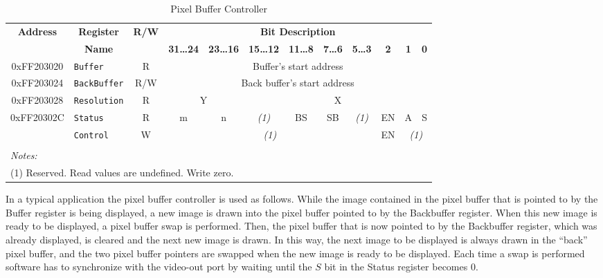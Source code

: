 \begin{table}[h]
    \centering
    \begin{tabular}{|c|l|c|c|c|c|c|c|c|c|c|c|}
        \hline
            \textbf{Address}
            & \multicolumn{1}{c|}{\textbf{Register}}
            & \multirow{2}{*}{\textbf{R/W}}
            & \multicolumn{9}{c|}{\textbf{Bit Description}}
        \\\cline{4-12}
            & \multicolumn{1}{c|}{\textbf{Name}}
            &
            & \textbf{31\ldots24}
            & \textbf{23\ldots16}
            & \textbf{15\ldots12}
            & \textbf{11\ldots8}
            & \textbf{7\ldots6}
            & \textbf{5\ldots3}
            & \textbf{2}
            & \textbf{1}
            & \textbf{0}
        \\\hline
            0xFF203020
            & \texttt{Buffer}
            & R
            & \multicolumn{9}{c|}{Buffer's start address}
        \\\hline
            0xFF203024
            & \texttt{BackBuffer}
            & R/W
            & \multicolumn{9}{c|}{Back buffer's start address}
        \\\hline
            0xFF203028
            & \texttt{Resolution}
            & R
            & \multicolumn{2}{c|}{Y}
            & \multicolumn{7}{c|}{X}
        \\\hline
            \multirow{2}{*}{0xFF20302C}
            & \texttt{Status}
            & R
            & m
            & n
            & {\footnotesize \it (1)}
            & BS
				& SB
            & {\footnotesize \it (1)}
            & EN
            & A
            & S
        \\\cline{2-12}

            & \texttt{Control}
            & W
            & \multicolumn{6}{c|}{\footnotesize \it (1)}
				& EN
            & \multicolumn{2}{c|}{\footnotesize \it (1)}
        \\\hline
                \multicolumn{11}{l}{}
        \\
                \multicolumn{11}{l}{\footnotesize \it{Notes: }}
        \\
                \multicolumn{11}{l}{\footnotesize{(1) Reserved. Read values are undefined. Write zero.}}
    \end{tabular}
		\caption{Pixel Buffer Controller}
		\label{tab:pixel_ctrl}
\end{table}

In a typical application the pixel buffer controller is used as follows. While the image
contained in the pixel buffer that is pointed to by the Buffer register is being displayed, 
a new image is drawn into the pixel buffer pointed to by the Backbuffer register. When this new
image is ready to be displayed, a pixel buffer swap is performed. Then, the pixel buffer 
that is now pointed to by the Backbuffer register, which was already displayed, is cleared and 
the next new image is drawn. In this way, the next image to be displayed is always drawn in
the ``back'' pixel buffer, and the two pixel buffer pointers are swapped when the new image 
is ready to be displayed. Each time a swap is performed software has to synchronize with
the video-out port by waiting until the $S$ bit in the Status register becomes 0.

